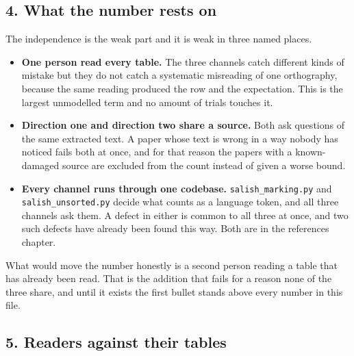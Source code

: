 \subsection{4. What the number rests on}

The independence is the weak part and it is weak in three named places.

\begin{itemize}
\item \textbf{One person read every table.} The three channels catch different kinds of mistake but they do not catch a systematic misreading of one orthography, because the same reading produced the row and the expectation. This is the largest unmodelled term and no amount of trials touches it.
\item \textbf{Direction one and direction two share a source.} Both ask questions of the same extracted text. A paper whose text is wrong in a way nobody has noticed fails both at once, and for that reason the papers with a known-damaged source are excluded from the count instead of given a worse bound.
\item \textbf{Every channel runs through one codebase.} \texttt{salish\_\allowbreak{}marking.\allowbreak{}py} and \texttt{salish\_\allowbreak{}unsorted.\allowbreak{}py} decide what counts as a language token, and all three channels ask them. A defect in either is common to all three at once, and two such defects have already been found this way. Both are in the references chapter.
\end{itemize}

What would move the number honestly is a second person reading a table that has already been read. That is the addition that fails for a reason none of the three share, and until it exists the first bullet stands above every number in this file.

\subsection{5. Readers against their tables}

